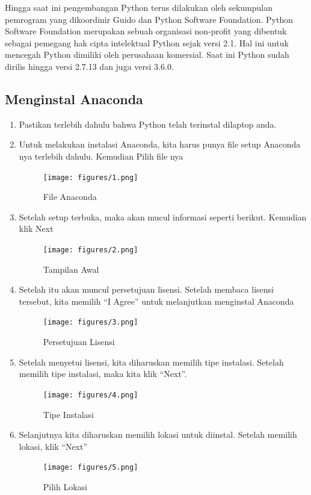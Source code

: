 Hingga saat ini pengembangan Python terus dilakukan oleh sekumpulan pemrogram yang dikoordinir Guido dan Python Software Foundation. Python Software Foundation merupakan sebuah organisasi non-profit yang dibentuk sebagai pemegang hak cipta intelektual Python sejak versi 2.1. Hal ini untuk mencegah Python dimiliki oleh perusahaan komersial. Saat ini Python sudah dirilis hingga versi 2.7.13 dan juga versi 3.6.0.

\subsection{Menginstal Anaconda}
\begin{enumerate}
\item Pastikan terlebih dahulu bahwa Python telah terinstal dilaptop anda.
\item Untuk melakukan instalasi Anaconda, kita harus punya file setup Anaconda nya terlebih dahulu. Kemudian Pilih file nya
\begin{figure}[!htbp]
    \centering
    \texttt{[image: figures/1.png]}
    \caption{File Anaconda}
    \label{file}
    \end{figure}

\item Setelah setup terbuka, maka akan mucul informasi seperti berikut. Kemudian klik Next
\begin{figure}[!htbp]
    \centering
    \texttt{[image: figures/2.png]}
    \caption{Tampilan Awal}
    \label{awal}
    \end{figure}

\item Setelah itu akan muncul persetujuan lisensi. Setelah membaca lisensi tersebut, kita memilih “I Agree” untuk melanjutkan menginstal Anaconda
\begin{figure}[!htbp]
    \centering
    \texttt{[image: figures/3.png]}
    \caption{Persetujuan Lisensi}
    \label{lisensi}
    \end{figure}

\item Setelah menyetui lisensi, kita diharuskan memilih tipe instalasi. Setelah memilih tipe instalasi, maka kita klik “Next”.
\begin{figure}[!htbp]
    \centering
    \texttt{[image: figures/4.png]}
    \caption{Tipe Instalasi}
    \label{instalasi}
    \end{figure}

\item Selanjutnya kita diharuskan memilih lokasi untuk diinstal. Setelah memilih lokasi, klik “Next”
\begin{figure}[!htbp]
    \centering
    \texttt{[image: figures/5.png]}
    \caption{Pilih Lokasi}
    \label{lokasi}
    \end{figure}


\end{enumerate}
